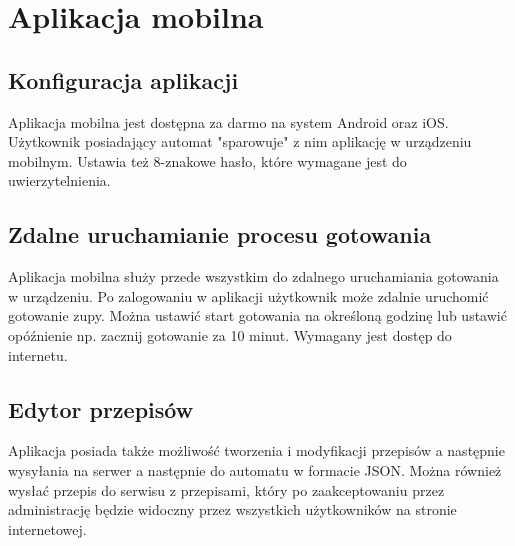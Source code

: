 \documentclass[12pt,a4paper,notitlepage]{article}
\begin{document}
\section{Aplikacja mobilna}
\subsection{Konfiguracja aplikacji}
Aplikacja mobilna jest dostępna za darmo na system Android oraz iOS. Użytkownik posiadający automat "sparowuje" z nim aplikację w urządzeniu mobilnym. Ustawia też 8-znakowe hasło, które wymagane jest do uwierzytelnienia.
\subsection{Zdalne uruchamianie procesu gotowania}
Aplikacja mobilna służy przede wszystkim do zdalnego uruchamiania gotowania w urządzeniu. Po zalogowaniu w aplikacji użytkownik może zdalnie uruchomić gotowanie zupy. Można ustawić start gotowania na określoną godzinę lub ustawić opóźnienie np. zacznij gotowanie za 10 minut. Wymagany jest dostęp do internetu.
\subsection{Edytor przepisów}
Aplikacja posiada także możliwość tworzenia i modyfikacji przepisów a następnie wysyłania na serwer a następnie do automatu w formacie JSON. Można również wysłać przepis do serwisu z przepisami, który po zaakceptowaniu przez administrację będzie widoczny przez wszystkich użytkowników na stronie internetowej.
\end{document}
